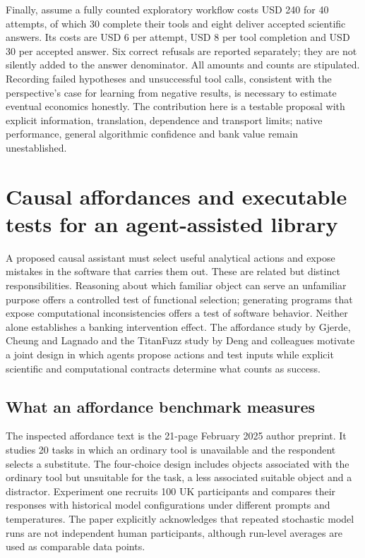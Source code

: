 Finally, assume a fully counted exploratory workflow costs USD 240 for 40 attempts,
of which 30 complete their tools and eight deliver accepted scientific answers.
Its costs are USD 6 per attempt, USD 8 per tool completion and USD 30 per accepted
answer. Six correct refusals are reported separately; they are not silently added
to the answer denominator. All amounts and counts are stipulated. Recording
failed hypotheses and unsuccessful tool calls, consistent with the perspective's
case for learning from negative results, is necessary to estimate eventual
economics honestly. The contribution here is a testable proposal with explicit
information, translation, dependence and transport limits; native performance,
general algorithmic confidence and bank value remain unestablished.
\citep{exec24_scimethod_original,exec24_scimethod_reference}


\section{Causal affordances and executable tests for an agent-assisted library}
\label{sec:exec24-affordance-fuzzing}
A proposed causal assistant must select useful analytical actions and expose mistakes in the software that carries them out. These are related but distinct responsibilities. Reasoning about which familiar object can serve an unfamiliar purpose offers a controlled test of functional selection; generating programs that expose computational inconsistencies offers a test of software behavior. Neither alone establishes a banking intervention effect. The affordance study by Gjerde, Cheung and Lagnado and the TitanFuzz study by Deng and colleagues motivate a joint design in which agents propose actions and test inputs while explicit scientific and computational contracts determine what counts as success.~\citep{exec24_affordance_original,exec24_fuzzing_original,exec24_affordance_fuzzing_reference}

\subsection{What an affordance benchmark measures}
The inspected affordance text is the 21-page February 2025 author preprint. It studies 20 tasks in which an ordinary tool is unavailable and the respondent selects a substitute. The four-choice design includes objects associated with the ordinary tool but unsuitable for the task, a less associated suitable object and a distractor. Experiment one recruits 100 UK participants and compares their responses with historical model configurations under different prompts and temperatures. The paper explicitly acknowledges that repeated stochastic model runs are not independent human participants, although run-level averages are used as comparable data points.~\citep{exec24_affordance_original}

